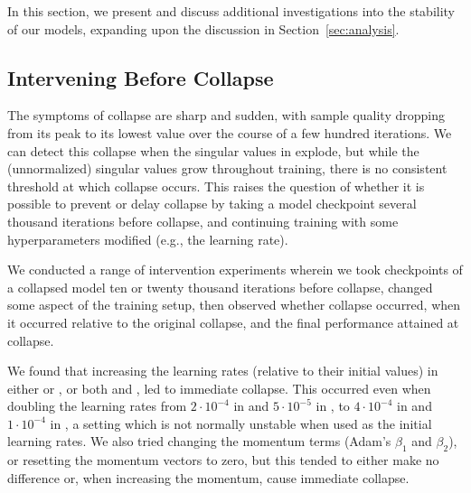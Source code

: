 In this section, we present and discuss additional investigations into the stability of our models, expanding upon the discussion in Section~\ref{sec:analysis}.

\subsection{Intervening Before Collapse}
The symptoms of collapse are sharp and sudden, with sample quality dropping from its peak to its lowest value over the course of a few hundred iterations. We can detect this collapse when the singular values in \gen{} explode, but while the (unnormalized) singular values grow throughout training, there is no consistent threshold at which collapse occurs. This raises the question of whether it is possible to prevent or delay collapse by taking a model checkpoint several thousand iterations before collapse, and continuing training with some hyperparameters modified (e.g., the learning rate).

We conducted a range of intervention experiments wherein we took checkpoints of a collapsed model ten or twenty thousand iterations before collapse, changed some aspect of the training setup, then observed whether collapse occurred, when it occurred relative to the original collapse, and the final performance attained at collapse.

We found that increasing the learning rates (relative to their initial values) in either \gen{} or \discr{}, or both \gen{} and \discr{},  led to immediate collapse. This occurred even when doubling the learning rates from $2\cdot10^{-4}$ in \discr{} and $5\cdot10^{-5}$ in \gen{}, to $4\cdot10^{-4}$ in \discr{} and $1\cdot10^{-4}$ in \gen{}, a setting which is not normally unstable when used as the initial learning rates. We also tried changing the momentum terms (Adam's $\beta_1$ and $\beta_2$), or resetting the momentum vectors to zero, but this tended to either make no difference or, when increasing the momentum, cause immediate collapse.


